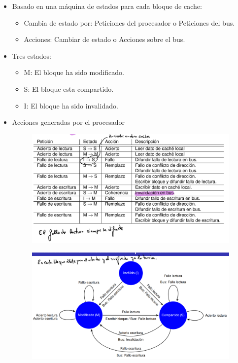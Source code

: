 \documentclass[12pt, twoside, openright]{report} %
\begin{document}
    \begin{itemize}
    \item
      Basado en una máquina de estados para cada bloque de cache:

      \begin{itemize}
      
      \item
        Cambia de estado por: Peticiones del procesador o Peticiones
        del bus.
      \item
        Acciones: Cambiar de estado o Acciones sobre el bus.
      \end{itemize}
    \item
      Tres estados:

      \begin{itemize}
      
      \item
        M: El bloque ha sido modificado.
      \item
        S: El bloque esta compartido.
      \item
        I: El bloque ha sido invalidado.
      \end{itemize}
    \item
      Acciones generadas por el procesador
      \begin{figure}[H]
        {\includegraphics[scale=.2]{Untitled 49.png}}
      \end{figure}
      \begin{figure}[H]
        {\includegraphics[scale=.2]{Untitled 50.png}}

\end{figure}
\end{itemize}
\end{document}
